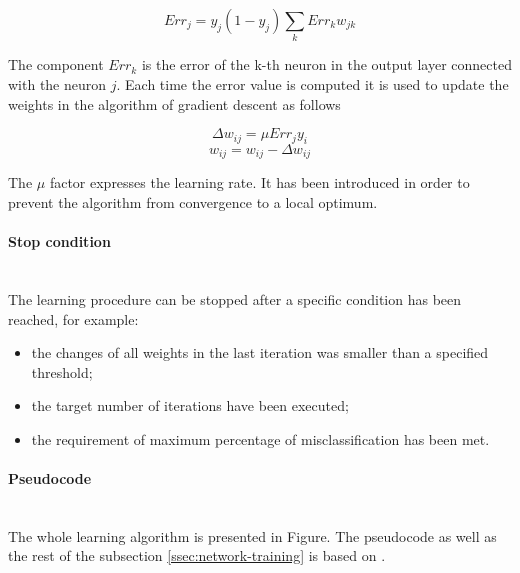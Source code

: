 \documentclass[11pt,oneside, a4paper]{report}
\begin{document}
\begin{equation}
Err_j = y_j(1-y_j) \sum_{k} Err_k w_{jk}
\end{equation}

The component $Err_k$ is the error of the k-th neuron in the output layer connected with the neuron $j$. Each time the error value is computed it is used to update the weights in the algorithm of gradient descent as follows

\begin{equation}
\Delta w_{ij} = \mu Err_j y_i
\end{equation}
\begin{equation}
w_{ij} = w_{ij} - \Delta w_{ij}
\end{equation}

The $\mu$ factor expresses the learning rate. It has been introduced in order to prevent the algorithm from convergence to a local optimum.

\paragraph{Stop condition}\mbox{}\\
The learning procedure can be stopped after a specific condition has been reached, for example:
\begin{itemize}
	\item the changes of all weights in the last iteration was smaller than a specified threshold; 
	\item the target number of iterations have been executed;
	\item the requirement of maximum percentage of misclassification has been met.
\end{itemize}

\paragraph{Pseudocode}\mbox{}\\
The whole learning algorithm is presented in Figure. The pseudocode as well as the rest of the subsection \ref{ssec:network-training} is based on \cite{HAN2005}.



{}

\end{document}
